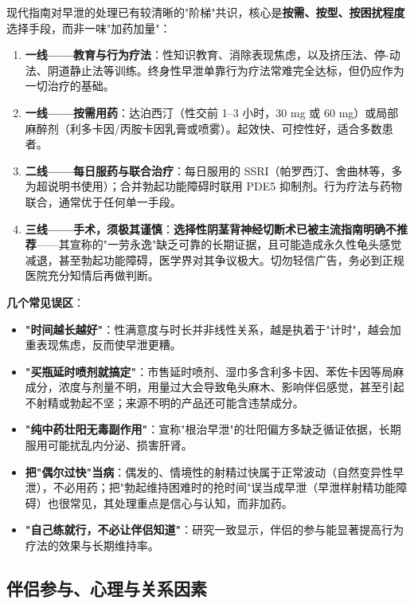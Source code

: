 现代指南对早泄的处理已有较清晰的"阶梯"共识，核心是\textbf{按需、按型、按困扰程度}选择手段，而非一味"加药加量"：

\begin{enumerate}
	\item \textbf{一线——教育与行为疗法}：性知识教育、消除表现焦虑，以及挤压法、停-动法、阴道静止法等训练。终身性早泄单靠行为疗法常难完全达标，但仍应作为一切治疗的基础。
	\item \textbf{一线——按需用药}：达泊西汀（性交前 1--3 小时，30 mg 或 60 mg）或局部麻醉剂（利多卡因/丙胺卡因乳膏或喷雾）。起效快、可控性好，适合多数患者。
	\item \textbf{二线——每日服药与联合治疗}：每日服用的 SSRI（帕罗西汀、舍曲林等，多为超说明书使用）；合并勃起功能障碍时联用 PDE5 抑制剂。行为疗法与药物联合，通常优于任何单一手段。
	\item \textbf{三线——手术，须极其谨慎}：\textbf{选择性阴茎背神经切断术已被主流指南明确不推荐}——其宣称的"一劳永逸"缺乏可靠的长期证据，且可能造成永久性龟头感觉减退，甚至勃起功能障碍，医学界对其争议极大。切勿轻信广告，务必到正规医院充分知情后再做判断。
\end{enumerate}

\noindent\textbf{几个常见误区}：

\begin{itemize}
	\item \textbf{"时间越长越好"}：性满意度与时长并非线性关系，越是执着于"计时"，越会加重表现焦虑，反而使早泄更糟。
	\item \textbf{"买瓶延时喷剂就搞定"}：市售延时喷剂、湿巾多含利多卡因、苯佐卡因等局麻成分，浓度与剂量不明，用量过大会导致龟头麻木、影响伴侣感觉，甚至引起不射精或勃起不坚；来源不明的产品还可能含违禁成分。
	\item \textbf{"纯中药壮阳无毒副作用"}：宣称"根治早泄"的壮阳偏方多缺乏循证依据，长期服用可能扰乱内分泌、损害肝肾。
	\item \textbf{把"偶尔过快"当病}：偶发的、情境性的射精过快属于正常波动（自然变异性早泄），不必用药；把"勃起维持困难时的抢时间"误当成早泄（早泄样射精功能障碍）也很常见，其处理重点是信心与认知，而非加药。
	\item \textbf{"自己练就行，不必让伴侣知道"}：研究一致显示，伴侣的参与能显著提高行为疗法的效果与长期维持率。
\end{itemize}

\subsection{伴侣参与、心理与关系因素}

